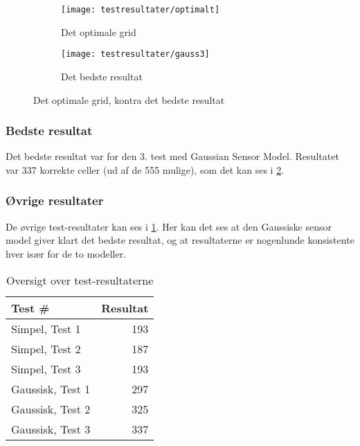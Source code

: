 \begin{figure}[h]
\centering
\begin{subfigure}[b]{.48\textwidth}
\centering
\texttt{[image: testresultater/optimalt]}
\caption{Det optimale grid}
\label{evaluering:optimaltgrid}
\end{subfigure}
\begin{subfigure}[b]{.48\textwidth}
\centering
\texttt{[image: testresultater/gauss3]}
\caption{Det bedste resultat}
\label{evaluering:gauss3}
\end{subfigure}
\caption{Det optimale grid, kontra det bedste resultat}
\label{evaluering:optvsbedst}
\end{figure}

\subsubsection{Bedste resultat}
Det bedste resultat var for den 3. test med Gaussian Sensor Model.
Resultatet var 337 korrekte celler (ud af de 555 mulige), som det kan ses i \cref{evaluering:gauss3}.

\subsubsection{Øvrige resultater}
De øvrige test-resultater kan ses i \cref{evaluering:testresultater}.
Her kan det ses at den Gaussiske sensor model giver klart det bedste resultat, og at resultaterne er nogenlunde konsistente hver især for de to modeller.

\begin{table}[h]
\centering
\begin{tabular}{|l|r|}
\hline
\textbf{Test \#} & \textbf{Resultat} \\ \hline \hline
Simpel, Test 1 & 193 \\ \hline
Simpel, Test 2 & 187 \\ \hline
Simpel, Test 3 & 193 \\ \hline \hline
Gaussisk, Test 1 & 297 \\ \hline
Gaussisk, Test 2 & 325 \\ \hline
Gaussisk, Test 3 & 337 \\ \hline
\end{tabular}
\caption{Oversigt over test-resultaterne}
\label{evaluering:testresultater}
\end{table}
